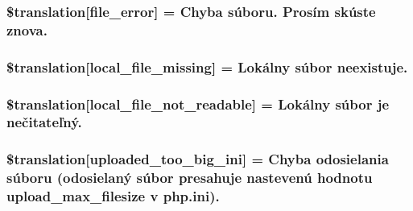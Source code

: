 \subsubsection[{\$translation}]{\setlength{\rightskip}{0pt plus 5cm}\$translation\mbox{[}\textquotesingle{}file\+\_\+error\textquotesingle{}\mbox{]} = \textquotesingle{}Chyba súboru. Prosím skúste znova.\textquotesingle{}}\label{class_8upload_8sk___s_k_8php_ac7498e49b9771b04698029aa61c70821}
\hypertarget{class_8upload_8sk___s_k_8php_a6ec3d3a47ab70d77e7aa593e82ead10e}{}
\subsubsection[{\$translation}]{\setlength{\rightskip}{0pt plus 5cm}\$translation\mbox{[}\textquotesingle{}local\+\_\+file\+\_\+missing\textquotesingle{}\mbox{]} = \textquotesingle{}Lokálny súbor neexistuje.\textquotesingle{}}\label{class_8upload_8sk___s_k_8php_a6ec3d3a47ab70d77e7aa593e82ead10e}
\hypertarget{class_8upload_8sk___s_k_8php_a60104befef9b241f3a7a6a755618a4b3}{}
\subsubsection[{\$translation}]{\setlength{\rightskip}{0pt plus 5cm}\$translation\mbox{[}\textquotesingle{}local\+\_\+file\+\_\+not\+\_\+readable\textquotesingle{}\mbox{]} = \textquotesingle{}Lokálny súbor je nečitateľný.\textquotesingle{}}\label{class_8upload_8sk___s_k_8php_a60104befef9b241f3a7a6a755618a4b3}
\hypertarget{class_8upload_8sk___s_k_8php_a6a08dcd0d3651fdd098568f6b2f0a42c}{}
\subsubsection[{\$translation}]{\setlength{\rightskip}{0pt plus 5cm}\$translation\mbox{[}\textquotesingle{}uploaded\+\_\+too\+\_\+big\+\_\+ini\textquotesingle{}\mbox{]} = \textquotesingle{}Chyba odosielania súboru (odosielaný súbor presahuje nastevenú hodnotu upload\+\_\+max\+\_\+filesize v php.\+ini).\textquotesingle{}}\label{class_8upload_8sk___s_k_8php_a6a08dcd0d3651fdd098568f6b2f0a42c}
\hypertarget{class_8upload_8sk___s_k_8php_a623d5b8b92169f57d7e43458aa911cbb}{}

